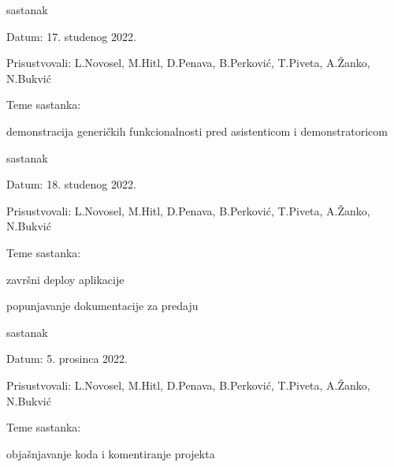 \begin{packed_enum}
            \item  sastanak
    			\item[] \begin{packed_item}
    				\item Datum: 17. studenog 2022.
    				\item Prisustvovali: L.Novosel, M.Hitl, D.Penava, B.Perković, T.Piveta, A.Žanko, N.Bukvić
    				\item Teme sastanka:
    				\begin{packed_item}
    				    \item  demonstracija generičkih funkcionalnosti pred asistenticom i demonstratoricom
    				\end{packed_item}
    			\end{packed_item}

             \item  sastanak
    			\item[] \begin{packed_item}
    				\item Datum: 18. studenog 2022.
    				\item Prisustvovali: L.Novosel, M.Hitl, D.Penava, B.Perković, T.Piveta, A.Žanko, N.Bukvić
    				\item Teme sastanka:
    				\begin{packed_item}
    				    \item  završni deploy aplikacije
                        \item  popunjavanje dokumentacije za predaju
    				\end{packed_item}
    			\end{packed_item}

                    \item  sastanak
    			\item[] \begin{packed_item}
    				\item Datum: 5. prosinca 2022.
    				\item Prisustvovali: L.Novosel, M.Hitl, D.Penava, B.Perković, T.Piveta, A.Žanko, N.Bukvić
    				\item Teme sastanka:
    				\begin{packed_item}
    				    \item  objašnjavanje koda i komentiranje projekta 
    				\end{packed_item}
    			\end{packed_item}


\end{packed_enum}

